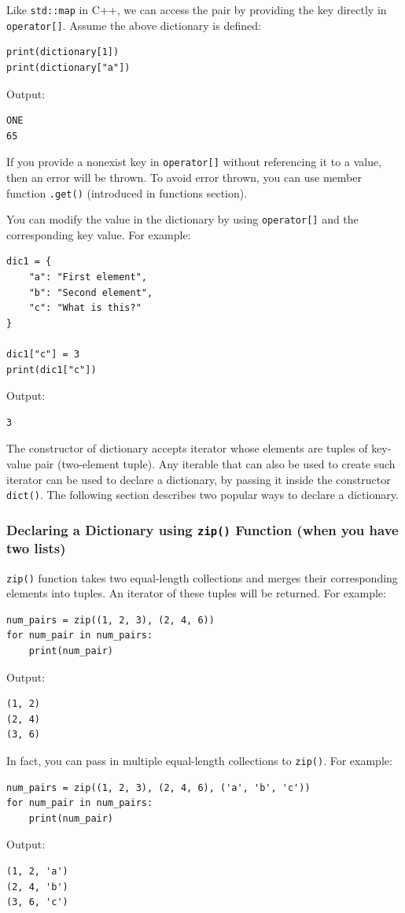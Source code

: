 \documentclass[12pt]{book}
\begin{document}
Like \texttt{std::map} in C++, we can access the pair by providing the key directly in \texttt{operator[]}. Assume the above dictionary is defined:
\begin{verbatim}
print(dictionary[1])
print(dictionary["a"])
\end{verbatim}
Output:
\begin{verbatim}
ONE
65
\end{verbatim}
If you provide a nonexist key in \texttt{operator[]} without referencing it to a value, then an error will be thrown. To avoid error thrown, you can use member function \texttt{.get()} (introduced in functions section).

You can modify the value in the dictionary by using \texttt{operator[]} and the corresponding key value. For example:
\begin{verbatim}
dic1 = {
    "a": "First element",
    "b": "Second element",
    "c": "What is this?"
}

dic1["c"] = 3
print(dic1["c"])
\end{verbatim}
Output:
\begin{verbatim}
3
\end{verbatim}

The constructor of dictionary accepts iterator whose elements are tuples of key-value pair (two-element tuple). Any iterable that can also be used to create such iterator can be used to declare a dictionary, by passing it inside the constructor \texttt{dict()}. The following section describes two popular ways to declare a dictionary.
\subsubsection{Declaring a Dictionary using \texttt{zip()} Function (when you have two lists)}
\label{sec:org9aaa470}
\texttt{zip()} function takes two equal-length collections and merges their corresponding elements into tuples. An iterator of these tuples will be returned. For example:
\begin{verbatim}
num_pairs = zip((1, 2, 3), (2, 4, 6))
for num_pair in num_pairs:
    print(num_pair)
\end{verbatim}
Output:
\begin{verbatim}
(1, 2)
(2, 4)
(3, 6)
\end{verbatim}
In fact, you can pass in multiple equal-length collections to \texttt{zip()}. For example:
\begin{verbatim}
num_pairs = zip((1, 2, 3), (2, 4, 6), ('a', 'b', 'c'))
for num_pair in num_pairs:
    print(num_pair)
\end{verbatim}
Output:
\begin{verbatim}
(1, 2, 'a')
(2, 4, 'b')
(3, 6, 'c')
\end{verbatim}
\end{document}
